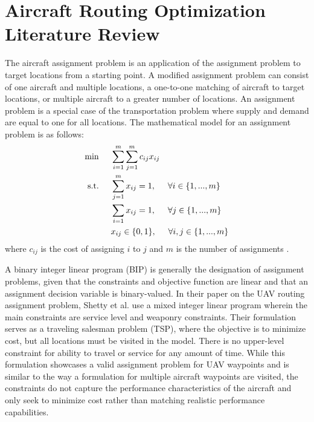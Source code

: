 \section{Aircraft Routing Optimization Literature Review}
The aircraft assignment problem is an application of the assignment problem to target locations from a starting point. A modified assignment problem can consist of one aircraft and multiple locations, a one-to-one matching of aircraft to target locations, or multiple aircraft to a greater number of locations. An assignment problem is a special case of the transportation problem where supply and demand are equal to one for all locations. The mathematical model for an assignment problem is as follows:
\begin{align}
    \min\hspace{0.5cm} &\sum_{i=1}^m\sum_{j = 1}^mc_{ij}x_{ij}\\
    \text{s.t.} \hspace{0.5cm} &\sum_{j=1}^mx_{ij} = 1, \hspace{0.5cm} \forall i \in \{1,...,m\}\\
    &\sum_{i=1}x_{ij} = 1, \hspace{0.5cm} \forall j \in \{1,...,m\}\\
    &x_{ij} \in \{0,1\}, \hspace{0.5cm} \forall i,j\in \{1,...,m\}
\end{align}
where $c_{ij}$ is the cost of assigning $i$ to $j$ and $m$ is the number of assignments \cite{bazaraa}. 
\par
A binary integer linear program (BIP) is generally the designation of assignment problems, given that the constraints and objective function are linear and that an assignment decision variable is binary-valued. In their paper on the UAV routing assignment problem, Shetty et al. \cite{Shetty} use a mixed integer linear program wherein the main constraints are service level and weaponry constraints. Their formulation serves as a traveling salesman problem (TSP), where the objective is to minimize cost, but all locations must be visited in the model. There is no upper-level constraint for ability to travel or service for any amount of time. While this formulation showcases a valid assignment problem for UAV waypoints and is similar to the way a formulation for multiple aircraft waypoints are visited, the constraints do not capture the performance characteristics of the aircraft and only seek to minimize cost rather than matching realistic performance capabilities. \par
